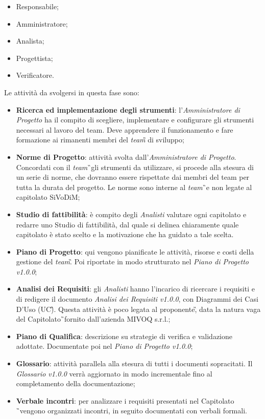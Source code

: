 \begin{itemize}
	\item Responsabile;
	\item Amministratore;
	\item Analista;
	\item Progettista;
	\item Verificatore.
\end{itemize}
Le attività da svolgersi in questa fase sono:
\begin{itemize}
	\item \textbf{Ricerca ed implementazione degli strumenti}: 
	l'\textit{Amministratore di Progetto} ha il compito di scegliere, 
	implementare e configurare gli strumenti necessari al lavoro del team. Deve 
	apprendere il funzionamento e fare formazione ai rimanenti membri del 
	\textit{team\G} di sviluppo;
	\item \textbf{Norme di Progetto}: attività svolta 
	dall'\textit{Amministratore di 
	Progetto}. Concordati con il \textit{team}\G\ gli strumenti da utilizzare, 
	si procede 	alla stesura di un serie di norme, che dovranno essere 
	rispettate dai membri del team per tutta la durata del progetto. Le norme 
	sono interne al \textit{team}\G\ e non legate al capitolato SiVoDiM;
	\item \textbf{Studio di fattibilità}: è compito degli \textit{Analisti} 
	valutare ogni capitolato e redarre uno Studio di fattibilità, dal quale si 
	delinea chiaramente quale capitolato è stato scelto e la motivazione che ha 
	guidato a tale scelta.
	\item \textbf{Piano di Progetto}: qui vengono pianificate le attività, 
	risorse e costi della gestione del \textit{team}\G. Poi riportate in modo 
	strutturato nel \textit{Piano di Progetto v1.0.0};
	\item \textbf{Analisi dei Requisiti}: gli \textit{Analisti} hanno 
	l'incarico di ricercare i requisiti e di redigere il documento 
	\textit{Analisi dei Requisiti v1.0.0}, con Diagrammi dei Casi D'Uso (UC\G). 
	Questa attività è poco legata	al proponente\G, data la natura vaga del 
	Capitolato\G\ fornito dall'azienda MIVOQ s.r.l.;
	\item \textbf{Piano di Qualifica}: descrizione su strategie di verifica e 
	validazione adottate. Documentate poi nel \textit{Piano di Progetto v1.0.0};
	\item \textbf{Glossario}: attività parallela alla stesura di tutti i 
	documenti sopracitati. Il \textit{Glossario v1.0.0} verrà aggiornato in 
	modo incrementale fino al completamento della documentazione;
	\item \textbf{Verbale incontri}: per analizzare i requisiti presentati nel 
	Capitolato \G\ vengono organizzati incontri, in seguito documentati con 
	verbali formali.
\end{itemize}

